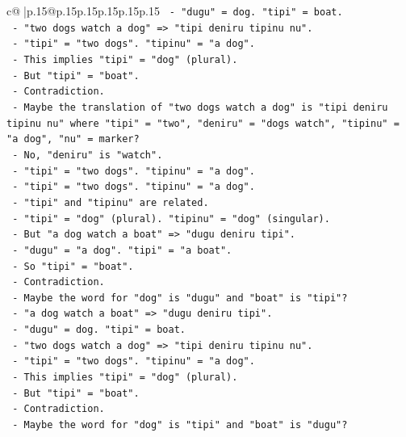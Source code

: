 \documentclass{article}
\begin{document}
{\begin{supertabular}{c@{$\;$}|p{.15\linewidth}@{}p{.15\linewidth}p{.15\linewidth}p{.15\linewidth}p{.15\linewidth}p{.15\linewidth}}
{{{\texttt{           {-} "dugu" = dog. "tipi" = boat.} \\
\texttt{         {-} "two dogs watch a dog" => "tipi deniru tipinu nu".} \\
\texttt{           {-} "tipi" = "two dogs". "tipinu" = "a dog".} \\
\texttt{           {-} This implies "tipi" = "dog" (plural).} \\
\texttt{           {-} But "tipi" = "boat".} \\
\texttt{           {-} Contradiction.} \\
\texttt{       {-} Maybe the translation of "two dogs watch a dog" is "tipi deniru tipinu nu" where "tipi" = "two", "deniru" = "dogs watch", "tipinu" = "a dog", "nu" = marker?} \\
\texttt{         {-} No, "deniru" is "watch".} \\
\texttt{         {-} "tipi" = "two dogs". "tipinu" = "a dog".} \\
\texttt{         {-} "tipi" = "two dogs". "tipinu" = "a dog".} \\
\texttt{         {-} "tipi" and "tipinu" are related.} \\
\texttt{         {-} "tipi" = "dog" (plural). "tipinu" = "dog" (singular).} \\
\texttt{         {-} But "a dog watch a boat" => "dugu deniru tipi".} \\
\texttt{           {-} "dugu" = "a dog". "tipi" = "a boat".} \\
\texttt{           {-} So "tipi" = "boat".} \\
\texttt{           {-} Contradiction.} \\
\texttt{       {-} Maybe the word for "dog" is "dugu" and "boat" is "tipi"?} \\
\texttt{         {-} "a dog watch a boat" => "dugu deniru tipi".} \\
\texttt{           {-} "dugu" = dog. "tipi" = boat.} \\
\texttt{         {-} "two dogs watch a dog" => "tipi deniru tipinu nu".} \\
\texttt{           {-} "tipi" = "two dogs". "tipinu" = "a dog".} \\
\texttt{           {-} This implies "tipi" = "dog" (plural).} \\
\texttt{           {-} But "tipi" = "boat".} \\
\texttt{           {-} Contradiction.} \\
\texttt{       {-} Maybe the word for "dog" is "tipi" and "boat" is "dugu"?} \\
}}}
\end{supertabular}}
\end{document}
